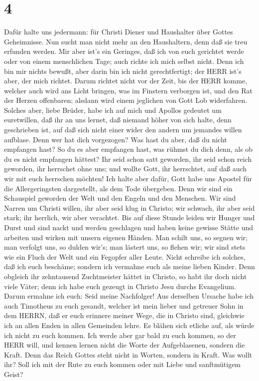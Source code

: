 \hypertarget{section-3}{%
\section{4}\label{section-3}}

 Dafür halte uns jedermann: für Christi Diener und
Haushalter über Gottes Geheimnisse.  Nun sucht man nicht
mehr an den Haushaltern, denn daß sie treu erfunden werden. 
Mir aber ist's ein Geringes, daß ich von euch gerichtet werde oder von
einem menschlichen Tage; auch richte ich mich selbst nicht. 
Denn ich bin mir nichts bewußt, aber darin bin ich nicht gerechtfertigt;
der HERR ist's aber, der mich richtet.  Darum richtet nicht
vor der Zeit, bis der HERR komme, welcher auch wird ans Licht bringen,
was im Finstern verborgen ist, und den Rat der Herzen offenbaren;
alsdann wird einem jeglichen von Gott Lob widerfahren. 
Solches aber, liebe Brüder, habe ich auf mich und Apollos gedeutet um
euretwillen, daß ihr an uns lernet, daß niemand höher von sich halte,
denn geschrieben ist, auf daß sich nicht einer wider den andern um
jemandes willen aufblase.  Denn wer hat dich vorgezogen? Was
hast du aber, daß du nicht empfangen hast? So du es aber empfangen hast,
was rühmst du dich denn, als ob du es nicht empfangen hättest?
 Ihr seid schon satt geworden, ihr seid schon reich
geworden, ihr herrschet ohne uns; und wollte Gott, ihr herrschtet, auf
daß auch wir mit euch herrschen möchten!  Ich halte aber
dafür, Gott habe uns Apostel für die Allergeringsten dargestellt, als
dem Tode übergeben. Denn wir sind ein Schauspiel geworden der Welt und
den Engeln und den Menschen.  Wir sind Narren um Christi
willen, ihr aber seid klug in Christo; wir schwach, ihr aber seid stark;
ihr herrlich, wir aber verachtet.  Bis auf diese Stunde
leiden wir Hunger und Durst und sind nackt und werden geschlagen und
haben keine gewisse Stätte  und arbeiten und wirken mit
unsern eigenen Händen. Man schilt uns, so segnen wir; man verfolgt uns,
so dulden wir's; man lästert uns, so flehen wir;  wir sind
stets wie ein Fluch der Welt und ein Fegopfer aller Leute. 
Nicht schreibe ich solches, daß ich euch beschäme; sondern ich vermahne
euch als meine lieben Kinder.  Denn obgleich ihr
zehntausend Zuchtmeister hättet in Christo, so habt ihr doch nicht viele
Väter; denn ich habe euch gezeugt in Christo Jesu durchs Evangelium.
 Darum ermahne ich euch: Seid meine Nachfolger!
 Aus derselben Ursache habe ich auch Timotheus zu euch
gesandt, welcher ist mein lieber und getreuer Sohn in dem HERRN, daß er
euch erinnere meiner Wege, die in Christo sind, gleichwie ich an allen
Enden in allen Gemeinden lehre.  Es blähen sich etliche
auf, als würde ich nicht zu euch kommen.  Ich werde aber
gar bald zu euch kommen, so der HERR will, und kennen lernen nicht die
Worte der Aufgeblasenen, sondern die Kraft.  Denn das Reich
Gottes steht nicht in Worten, sondern in Kraft.  Was wollt
ihr? Soll ich mit der Rute zu euch kommen oder mit Liebe und
sanftmütigem Geist?

